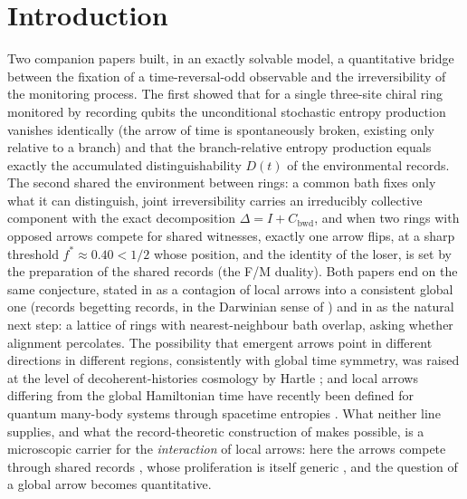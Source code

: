 \documentclass[11pt]{article}
\begin{document}
\tableofcontents

\section{Introduction}

Two companion papers built, in an exactly solvable model, a quantitative
bridge between the fixation of a time-reversal-odd observable and the
irreversibility of the monitoring process. The first \cite{p1} showed that
for a single three-site chiral ring monitored by recording qubits the
unconditional stochastic entropy production vanishes identically (the arrow
of time is spontaneously broken, existing only relative to a branch) and
that the branch-relative entropy production equals exactly the accumulated
distinguishability $D(t)$ of the environmental records. The second \cite{p2}
shared the environment between rings: a common bath fixes only what it can
distinguish, joint irreversibility carries an irreducibly collective
component with the exact decomposition $\Delta = I + C_{\mathrm{bwd}}$, and
when two rings with opposed arrows compete for shared witnesses, exactly one
arrow flips, at a sharp threshold $f^* \approx 0.40 < 1/2$ whose position,
and the identity of the loser, is set by the preparation of the shared
records (the F/M duality). Both papers end on the same conjecture, stated in
\cite{p1} as a contagion of local arrows into a consistent global one
(records begetting records, in the Darwinian sense of
\cite{zurek2003,zurek2009,riedel2012,ollivier,korbicz}) and in \cite{p2} as the natural next step: a
lattice of rings with nearest-neighbour bath overlap, asking whether
alignment percolates. The possibility that emergent arrows point in
different directions in different regions, consistently with global time
symmetry, was raised at the level of decoherent-histories cosmology by
Hartle \cite{hartle}; and local arrows differing from the global
Hamiltonian time have recently been defined for quantum many-body systems
through spacetime entropies \cite{yates}. What neither line supplies, and
what the record-theoretic construction of \cite{p1,p2} makes possible, is
a microscopic carrier for the \emph{interaction} of local arrows: here the
arrows compete through shared records \cite{maccone,zurekbook}, whose
proliferation is itself generic \cite{brandao}, and the question of a
global arrow becomes quantitative.
\end{document}
